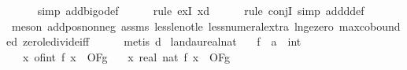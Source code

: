 \begin{isabellebody}
\ \ \ \ \isamarkupfalse%
\ {\isacharparenleft}{\kern0pt}simp\ add{\isacharcolon}{\kern0pt}bigo{\isacharunderscore}{\kern0pt}def{\isacharparenright}{\kern0pt}\isanewline
\ \ \ \ \isamarkupfalse%
\ {\isacharparenleft}{\kern0pt}rule\ exI{\isacharbrackleft}{\kern0pt}\ x{\isacharequal}{\kern0pt}{\isachardoublequoteopen}d{\isachardoublequoteclose}{\isacharbrackright}{\kern0pt}{\isacharparenright}{\kern0pt}\isanewline
\ \ \ \ \isamarkupfalse%
\ {\isacharparenleft}{\kern0pt}rule\ conjI{\isacharcomma}{\kern0pt}\ simp\ add{\isacharcolon}{\kern0pt}d{\isacharunderscore}{\kern0pt}def{\isacharparenright}{\kern0pt}\isanewline
\ \ \ \ \ \isamarkupfalse%
\ {\isacharparenleft}{\kern0pt}meson\ add{\isacharunderscore}{\kern0pt}pos{\isacharunderscore}{\kern0pt}nonneg\ assms{\isacharparenleft}{\kern0pt}{}{\isacharparenright}{\kern0pt}\ less{\isacharunderscore}{\kern0pt}le{\isacharunderscore}{\kern0pt}not{\isacharunderscore}{\kern0pt}le\ less{\isacharunderscore}{\kern0pt}numeral{\isacharunderscore}{\kern0pt}extra{\isacharparenleft}{\kern0pt}{}{\isacharparenright}{\kern0pt}\ ln{\isacharunderscore}{\kern0pt}ge{\isacharunderscore}{\kern0pt}zero\ max{\isachardot}{\kern0pt}cobounded{}\ zero{\isacharunderscore}{\kern0pt}le{\isacharunderscore}{\kern0pt}divide{\isacharunderscore}{\kern0pt}iff{\isacharparenright}{\kern0pt}\isanewline
\ \ \ \ \isamarkupfalse%
\ {\isacharparenleft}{\kern0pt}metis\ d{\isacharparenright}{\kern0pt}\isanewline
{}\isamarkupfalse%
%
\endisatagproof
{\isafoldproof}%
%
\isadelimproof
\isanewline
%
\endisadelimproof
\isanewline
{}\isamarkupfalse%
\ landau{\isacharunderscore}{\kern0pt}real{\isacharunderscore}{\kern0pt}nat{\isacharcolon}{\kern0pt}\isanewline
\ \ \ f\ {\isacharcolon}{\kern0pt}{\isacharcolon}{\kern0pt}\ {\isachardoublequoteopen}{\isacharprime}{\kern0pt}a\ {\isasymRightarrow}\ int{\isachardoublequoteclose}\isanewline
\ \ \ {\isachardoublequoteopen}{\isacharparenleft}{\kern0pt}{\isasymlambda}x{\isachardot}{\kern0pt}\ of{\isacharunderscore}{\kern0pt}int\ {\isacharparenleft}{\kern0pt}f\ x{\isacharparenright}{\kern0pt}{\isacharparenright}{\kern0pt}\ {\isasymin}\ O{\isacharbrackleft}{\kern0pt}F{\isacharprime}{\kern0pt}{\isacharbrackright}{\kern0pt}{\isacharparenleft}{\kern0pt}g{\isacharparenright}{\kern0pt}{\isachardoublequoteclose}\isanewline
\ \ \ {\isachardoublequoteopen}{\isacharparenleft}{\kern0pt}{\isasymlambda}x{\isachardot}{\kern0pt}\ real\ {\isacharparenleft}{\kern0pt}nat\ {\isacharparenleft}{\kern0pt}f\ x{\isacharparenright}{\kern0pt}{\isacharparenright}{\kern0pt}{\isacharparenright}{\kern0pt}\ {\isasymin}\ O{\isacharbrackleft}{\kern0pt}F{\isacharprime}{\kern0pt}{\isacharbrackright}{\kern0pt}{\isacharparenleft}{\kern0pt}g{\isacharparenright}{\kern0pt}{\isachardoublequoteclose}\isanewline

\end{isabellebody}
